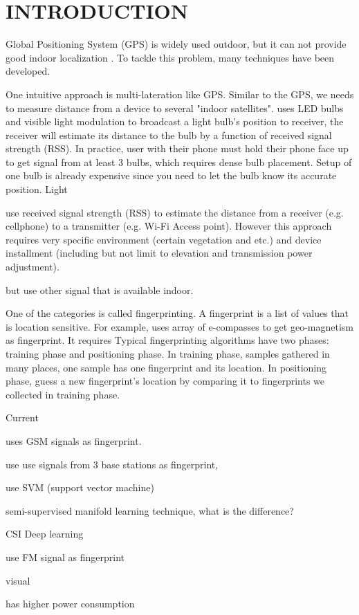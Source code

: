 \chapter{INTRODUCTION}

Global Positioning System (GPS) is widely used outdoor, but it can not provide good indoor localization \cite{pulkkinen2011semi, varshavsky2007gsm}. To tackle this problem, many techniques have been developed. 

One intuitive approach is multi-lateration like GPS. Similar to the GPS, we needs to measure distance from a device to several "indoor satellites". \cite{hu2013pharos} uses LED bulbs and visible light modulation to broadcast a light bulb's position to receiver, the receiver will estimate its distance to the bulb by a function of received signal strength (RSS). In practice, user with their phone must hold their phone face up to get signal from at least 3 bulbs, which requires dense bulb placement. Setup of one bulb is already expensive since you need to let the bulb know its accurate position. Light 



\cite{whitehouse2007practical} use received signal strength (RSS) to estimate the distance from a receiver (e.g. cellphone) to a transmitter (e.g. Wi-Fi Access point). However this approach requires very specific environment (certain vegetation and etc.) and device installment (including but not limit to elevation and transmission power adjustment). 

but use other signal that is available indoor.

 
One of the categories is called fingerprinting. A fingerprint is a list of values that is location sensitive. For example, \cite{chung2011indoor} uses array of e-compasses to get geo-magnetism as fingerprint. It requires  Typical fingerprinting algorithms have two phases: training phase and positioning phase. In training phase, samples gathered in many places, one sample has one fingerprint and its location. In positioning phase, guess a new fingerprint's location by comparing it to fingerprints we collected in training phase. 

Current 


\cite{varshavsky2007gsm} uses GSM signals as fingerprint. 

\cite{bahl2000radar} use use signals from 3 base stations as fingerprint,

\cite{brunato2005statistical} use SVM (support vector machine)

\cite{pulkkinen2011semi}semi-supervised manifold learning technique, what is the difference? 

CSI Deep learning

\cite{chen2012fm} use FM signal as fingerprint

visual

has higher power consumption